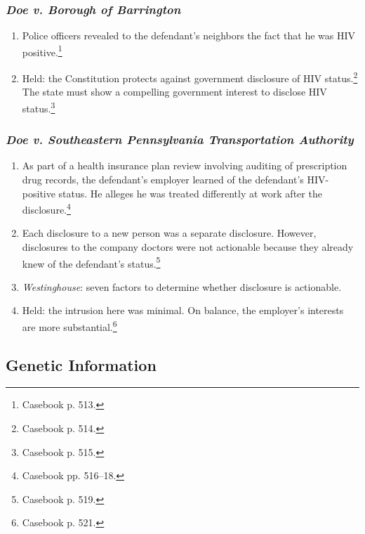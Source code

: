 
\subsubsection{\emph{Doe v. Borough of Barrington}}


\begin{enumerate}
    \item Police officers revealed to the defendant's neighbors the fact that he 
    was HIV positive.\footnote{Casebook p. 513.}
    \item Held: the Constitution protects against government disclosure of HIV 
    status.\footnote{Casebook p. 514.} The state must show a compelling 
    government interest to disclose HIV status.\footnote{Casebook p. 515.}
\end{enumerate}

\newpage %

\subsubsection{\emph{Doe v. Southeastern Pennsylvania Transportation Authority}}


\begin{enumerate}
    \item As part of a health insurance plan review involving auditing of 
    prescription drug records, the defendant's employer learned of the 
    defendant's HIV-positive status. He alleges he was treated differently at 
    work after the disclosure.\footnote{Casebook pp. 516--18.}
    \item Each disclosure to a new person was a separate 
    disclosure. However, disclosures to the company doctors were not actionable 
    because they already knew of the defendant's status.\footnote{Casebook p. 
    519.}
    \item \emph{Westinghouse}: seven factors to determine whether disclosure is 
    actionable.
    \item Held: the intrusion here was minimal. On balance, the employer's 
    interests are more substantial.\footnote{Casebook p. 521.}
\end{enumerate}

\subsection{Genetic Information}

